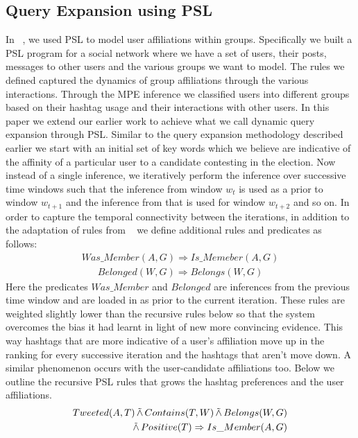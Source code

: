 \subsection{Query Expansion using PSL}
In ~\cite{huang2012social}, we used PSL to model user affiliations within groups. 
Specifically we built a PSL program for a  social network where we have a set of users, their posts, messages to other users and the various groups we want to model. 
The rules we defined captured the dynamics of group affiliations through the various interactions.
Through the MPE inference we classified users into different groups based on their hashtag usage and their interactions with other users.
\newline
In this paper we extend our earlier work to achieve what we call dynamic query expansion through PSL. 
Similar to the query expansion methodology described earlier we start with an initial set of key words which we believe are indicative of the affinity of a particular user to a candidate contesting in the election.
Now instead of a single inference, we iteratively perform the inference over successive time windows such that the inference from window $w_t$ is used as a prior to window $w_{t+1}$ and the inference from that is used for window $w_{t+2}$ and so on.
In order to capture the temporal connectivity between the iterations, in addition to the adaptation of rules from ~\cite{huang2012social} we define additional rules and predicates as follows:
\begin{align*}
Was\_Member(A,G) \Rightarrow Is\_Memeber(A,G)
\end{align*}
\begin{align*}
Belonged(W,G) \Rightarrow Belongs(W,G)
\end{align*}
Here the predicates $Was\_Member$ and $Belonged$ are inferences from the previous time window and are loaded in as  prior to the current iteration.
These rules are weighted slightly lower than the recursive rules below so that the system overcomes the bias it had learnt in light of new more convincing evidence.
This way hashtags that are more indicative of a user's affiliation move up in the ranking for every successive iteration and the hashtags that aren't move down.
A similar phenomenon occurs with the user-candidate affiliations too.
Below we outline the recursive PSL rules that grows the hashtag preferences and the user affiliations. 
\begin{align*}
\begin{split}
Tweeted(A,T) 
	\softand Contains(T,W)
	\softand Belongs(W,G) \\ 
	\softand Positive(T)
	\Rightarrow Is\_Member(A,G)
\end{split}
\end{align*}

